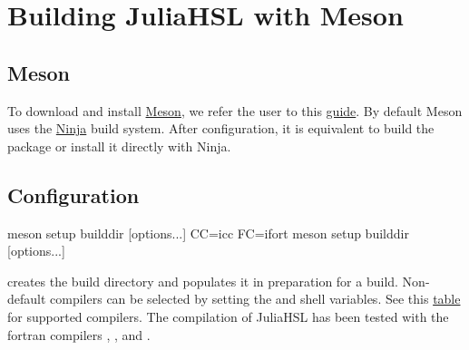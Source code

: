 \documentclass[gdweb]{geradwp}
\begin{document}
\section{Building JuliaHSL with Meson}

\subsection{Meson}

To download and install \href{https://mesonbuild.com}{Meson}, we refer the user to this \href{https://mesonbuild.com/SimpleStart.html}{guide}.
By default Meson uses the \href{https://ninja-build.org/}{Ninja} build system.
After configuration, it is equivalent to build the package or install it directly with Ninja.

\subsection{Configuration}

\begin{jllisting}
meson setup builddir [options...]
CC=icc FC=ifort meson setup builddir [options...]
\end{jllisting}
creates the build directory  and populates it in preparation for a build.
Non-default compilers can be selected by setting the  and  shell variables.
See this \href{https://mesonbuild.com/Reference-tables.html}{table} for supported compilers.
The compilation of JuliaHSL has been tested with the fortran compilers , ,  and .
\end{document}
